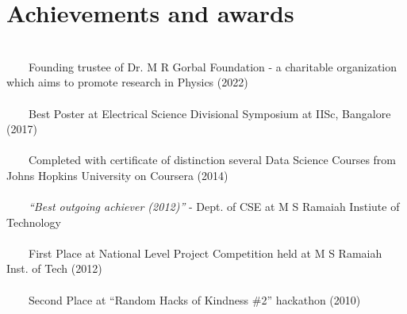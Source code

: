 \documentclass[a4paper,10pt]{article} %
\newcommand{\tabitem}{~~\llap{\textbullet}~~}
\begin{document}

\section{Achievements and awards}
~\\
\tabitem Founding trustee of Dr. M R Gorbal Foundation - a charitable organization which aims to promote research in Physics (2022) \\
~\\
\tabitem Best Poster at Electrical Science Divisional Symposium at IISc, Bangalore (2017)\\
\\
\tabitem Completed with certificate of distinction several Data Science Courses from Johns Hopkins University on Coursera (2014)\\
\\
\tabitem \textit{``Best outgoing achiever (2012)”} - Dept. of CSE at M S Ramaiah Instiute of Technology \\
\\
\tabitem First Place at National Level Project Competition held at M S Ramaiah Inst. of Tech (2012)\\
\\
\tabitem Second Place at “Random Hacks of Kindness \#2” hackathon (2010)\\

\end{document}
